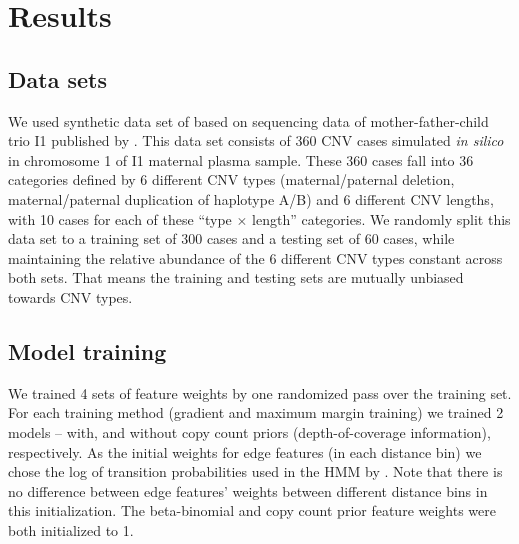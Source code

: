 \section{Results}

\subsection{Data sets}
We used synthetic data set of \cite{rampasek2014fcnv} based on sequencing data of mother-father-child trio I1 published by \cite{kitzman2012}. This data set consists of 360 CNV cases simulated \textit{in silico} in chromosome 1 of I1 maternal plasma sample. These 360 cases fall into 36 categories defined by 6 different CNV types (maternal/paternal deletion, maternal/paternal duplication of haplotype A/B) and 6 different CNV lengths, with 10 cases for each of these ``type $\times$ length'' categories. We randomly split this data set to a training set of 300 cases and a testing set of 60 cases, while maintaining the relative abundance of the 6 different CNV types constant across both sets. That means the training and testing sets are mutually unbiased towards CNV types.

\subsection{Model training}
We trained 4 sets of feature weights by one randomized pass over the training set. For each training method (gradient and maximum margin training) we trained 2 models -- with, and without copy count priors (depth-of-coverage information), respectively. As the initial weights for edge features (in each distance bin) we chose the log of transition probabilities used in the HMM by \cite{rampasek2014fcnv}. Note that there is no difference between edge features' weights between different distance bins in this initialization. The beta-binomial and copy count prior feature weights were both initialized to 1.

